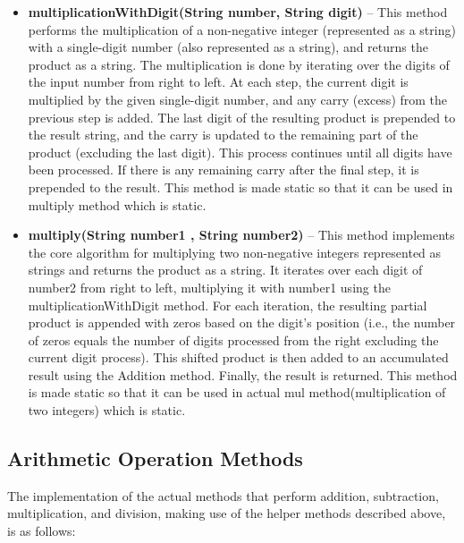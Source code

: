 \documentclass[a4paper,12pt]{article}
\begin{document}
\begin{itemize}
    \item \textbf{multiplicationWithDigit(String number, String digit)} -- This method performs the multiplication of a non-negative integer (represented as a string) with a single-digit number (also represented as a string), and returns the product as a string. The multiplication is done by iterating over the digits of the input number from right to left. At each step, the current digit is multiplied by the given single-digit number, and any carry (excess) from the previous step is added. The last digit of the resulting product is prepended to the result string, and the carry is updated to the remaining part of the product (excluding the last digit). This process continues until all digits have been processed. If there is any remaining carry after the final step, it is prepended to the result. This method is made static so that it can be used in multiply method which is static.\\
    \item \textbf{multiply(String number1 , String number2)} -- This method implements the core algorithm for multiplying two non-negative integers represented as strings and returns the product as a string. It iterates over each digit of number2 from right to left, multiplying it with number1 using the multiplicationWithDigit method. For each iteration, the resulting partial product is appended with zeros based on the digit’s position (i.e., the number of zeros equals the number of digits processed from the right excluding the current digit process). This shifted product is then added to an accumulated result using the Addition method. Finally, the result is returned. This method is made static so that it can be used in actual mul method(multiplication of two integers) which is static.\\
\end{itemize}

\subsection{Arithmetic Operation Methods}
The implementation of the actual methods that perform addition, subtraction, multiplication, and division, making use of the helper methods described above, is as follows:\\
\end{document}
